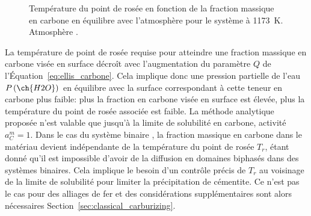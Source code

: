 \begin{figure}[!b]
  \centering
  
  \caption{\label{fig:dew_point_iron}Température du point de rosée en fonction de la fraction massique en carbone en équilibre avec l'atmosphère pour le système à \SI{1173}{\kelvin}. Atmosphère .}
\end{figure}

La température de point de rosée requise pour atteindre une fraction massique en carbone visée en surface décroît avec l'augmentation du paramètre $Q$ de l'Équation~\ref{eq:ellis_carbone}. Cela implique donc une pression partielle de l'eau $P\left(\ch{H2O}\right)$ en équilibre avec la surface correspondant à cette teneur en carbone plus faible: plus la fraction en carbone visée en surface est élevée, plus la température du point de rosée associée est faible. La méthode analytique proposée n'est valable que jusqu'à la limite de solubilité en carbone, activité $a_{C}^{m}={1}$. Dans le cas du système binaire , la fraction massique en carbone dans le matériau devient indépendante de la température du point de rosée $T_{r}$, étant donné qu'il est impossible d'avoir de la diffusion en domaines biphasés dans des systèmes binaires. Cela implique le besoin d'un contrôle précis de $T_{r}$ au voisinage de la limite de solubilité pour limiter la précipitation de cémentite.  Ce n'est pas le cas pour des alliages de fer et des considérations supplémentaires sont alors nécessaires \textemdash{} Section~\ref{sec:classical_carburizing}.


